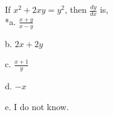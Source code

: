 
If \( x^{2} + 2xy = y^{2} \), then \( \frac{dy}{dx} \) is,\\

*a. \( \frac{ x + y }{ x - y } \)

b. \( 2x + 2y \) 

c. \( \frac{ x + 1 }{ y } \)

d. \( -x \)

e. I do not know.\\
